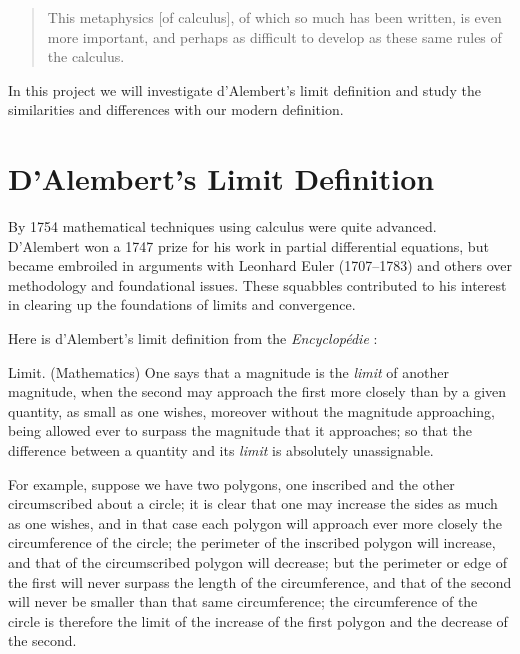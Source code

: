 \documentclass[11pt]{article}%
\newenvironment{source}%
 {  \nopagebreak[4]\begin{quoting}
        \nopagebreak[4]  \begin{sf} \vspace*{0.1in}  }
   {   \end{sf}  \nopagebreak[4]   \end{quoting} \nopagebreak[4] }%
\begin{document}
\begin{quotation}
{\sf This metaphysics [of calculus], of which so much has been written, is even
more important, and perhaps as difficult to develop as these same rules of the calculus.}
\end{quotation}

\noindent In this project we will investigate d'Alembert's limit definition and study
the similarities and differences with our modern definition.




\section{D'Alembert's Limit Definition}

By 1754 mathematical techniques using calculus were quite advanced. D'Alembert
won a 1747 prize for his work in partial differential equations, but became
embroiled in arguments with Leonhard Euler (1707--1783) and others over methodology and foundational
issues. These squabbles contributed to his interest in clearing up the
foundations of limits and convergence.


\newpage
Here is d'Alembert's limit definition from the \emph{Encyclop\'{e}die} \citep{DAlembert1754a}:


\begin{source}
Limit. (Mathematics) One says that a magnitude is the \textit{limit} of
another magnitude, when the second may approach the first more closely than by
a given quantity, as small as one wishes, moreover without the magnitude
approaching, being allowed ever to surpass the magnitude that it approaches;
so that the difference between a quantity and its \textit{limit} is absolutely unassignable.

For example, suppose we have two polygons, one inscribed and the other
circumscribed about a circle; it is clear that one may increase the sides as
much as one wishes, and in that case each polygon will approach ever more
closely the circumference of the circle; the perimeter of the inscribed
polygon will increase, and that of the circumscribed polygon will decrease;
but the perimeter or edge of the first will never surpass the length of the
circumference, and that of the second will never be smaller than that same
circumference; the circumference of the circle is therefore the limit of the
increase of the first polygon and the decrease of the second.


\end{source}
\end{document}
